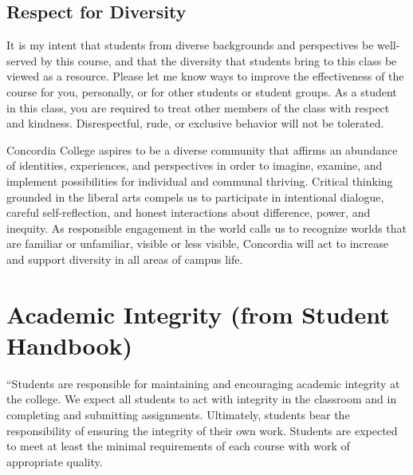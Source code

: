 \documentclass{tufte-handout}
\begin{document}
\begin{fullwidth}
\subsection{Respect for Diversity}

It is my intent that students from diverse backgrounds and perspectives be well-served by this course, and that the diversity that students bring to this class be viewed as a resource. Please let me know ways to improve the effectiveness of the course for you, personally, or for other students or student groups. As a student in this class, you are required to treat other members of the class with respect and kindness. Disrespectful, rude, or exclusive behavior will not be tolerated.

 Concordia College aspires to be a diverse community that affirms an abundance of identities, experiences, and perspectives in order to imagine, examine, and implement possibilities for individual and communal thriving. Critical thinking grounded in the liberal arts compels us to participate in intentional dialogue, careful self-reflection, and honest interactions about difference, power, and inequity. As responsible engagement in the world calls us to recognize worlds that are familiar or unfamiliar, visible or less visible, Concordia will act to increase and support diversity in all areas of campus life.

\end{fullwidth}

\section{Academic Integrity (from Student Handbook)}



``Students are responsible for maintaining and encouraging academic integrity at the college. We expect all students to act with integrity in the classroom and in completing and submitting assignments. Ultimately, students bear the responsibility of ensuring the integrity of their own work. Students are expected to meet at least the minimal requirements of each course with work of appropriate quality. 
\end{document}
